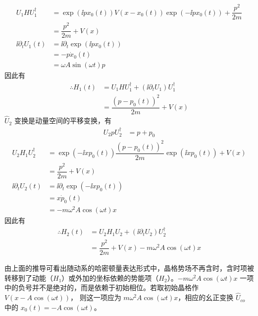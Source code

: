 \begin{align}
    U_1HU_1^{\dagger}
        &=\exp(\ii px_0(t))V(x-x_0(t))\exp(-\ii px_0(t))+\dfrac{p^2}{2m} \nonumber\\
        &=\dfrac{p^2}{2m}+V(x)\\
    \ii\partial_tU_1(t)
        &= \ii\partial_t\exp(\ii px_0(t)) \nonumber \\
        &= -p\dot{x}_0(t) \nonumber \\
        &= \omega A\sin(\omega t)p  
\end{align}
因此有
\begin{align}
    \therefore H_1(t) &=U_1HU_1^{\dagger}+(\ii\partial_tU_1)U_1^{\dagger} \nonumber \\
        &= \dfrac{(p-p_0(t))^2}{2m}+V(x) 
\end{align}
$\hat{U}_2$ 变换是动量空间的平移变换，有
\begin{align}
    U_2pU_2^{\dagger} &=p+p_0
\end{align}
\begin{align}
    U_2H_1U_2^{\dagger}&=\exp(-\ii xp_0(t))\dfrac{(p-p_0(t))^2}{2m}\exp(\ii xp_0(t))+V(x) \nonumber\\
        &=\dfrac{p^2}{2m}+V(x)\\
    \ii\partial_tU_2(t) &=\ii\partial_t\exp(-\ii xp_0(t)) \nonumber\\
        &= x \dot{p}_0(t) \nonumber\\
        &= -m\omega^2A\cos(\omega t)x
\end{align}
因此有
\begin{align}
    \therefore H_2(t)&=U_2H_1U_2+(\ii\partial_tU_2)U_2^{\dagger} \nonumber\\
        &= \dfrac{p^2}{2m}+V(x)-m\omega^2A\cos(\omega t)x
\end{align}

由上面的推导可看出随动系的哈密顿量表达形式中，晶格势场不再含时，含时项被转移到了动能（$H_1$）或外加的坐标依赖的势能项（$H_2$）。$-m\omega^2A\cos(\omega t)x$ 一项中的负号并不是绝对的，而是依赖于初始相位。若取初始晶格作 $V(x-A\cos(\omega t))$， 则这一项应为 $m\omega^2A\cos(\omega t)x$，相应的幺正变换 $\hat{U}_{co}$ 中的 $x_0(t) = -A\cos(\omega t)$。



